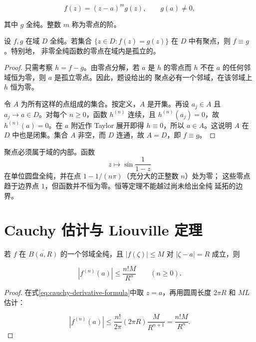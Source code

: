 \begin{equation}
 f(z)=(z-a)^m g(z),\qquad g(a)\ne0,
 \label{eq:holomorphic-zero-factorization}
\end{equation}

其中 \(g\) 全纯。整数 \(m\) 称为零点的阶。

\begin{corollary}[恒等定理]
\label{cor:holomorphic-identity-theorem}
设 \(f,g\) 在域 \(D\) 全纯。若集合
\(\{z\in D:f(z)=g(z)\}\) 在 \(D\) 中有聚点，则 \(f\equiv g\)。特别地，
非零全纯函数的零点在域内是孤立的。
\end{corollary}

\begin{proof}
只需考察 \(h=f-g\)。由零点分解，若 \(a\) 是 \(h\) 的零点而 \(h\)
不在 \(a\) 的任何邻域恒为零，则 \(a\) 是孤立零点。因此，题设给出的
聚点必有一个邻域，在该邻域上 \(h\) 恒为零。

令 \(A\) 为所有这样的点组成的集合。按定义，\(A\) 是开集。再设
\(a_j\in A\) 且 \(a_j\to a\in D\)。对每个 \(n\geq 0\)，函数
\(h^{(n)}\) 连续，且 \(h^{(n)}(a_j)=0\)，故 \(h^{(n)}(a)=0\)。在
\(a\) 附近作 Taylor 展开即得 \(h\equiv0\)，所以 \(a\in A\)。这说明
\(A\) 在 \(D\) 中也是闭集。集合 \(A\) 非空，而 \(D\) 连通，故
\(A=D\)，即 \(f\equiv g\)。
\end{proof}

聚点必须属于域的内部。函数
\[
 z\longmapsto \sin\frac1{1-z}
\]
在单位圆盘全纯，并在点 \(1-1/(n\pi)\)（充分大的正整数 \(n\)）处为零；
这些零点趋于边界点 \(1\)，但函数并不恒为零。恒等定理不能越过尚未给出全纯
延拓的边界。

\section{Cauchy 估计与 Liouville 定理}

\begin{theorem}[Cauchy 估计]
\label{thm:cauchy-estimates}
若 \(f\) 在 \(\overline{B(a,R)}\) 的一个邻域全纯，且
\(|f(\zeta)|\le M\) 对 \(|\zeta-a|=R\) 成立，则

\[
 |f^{(n)}(a)|\le\frac{n!M}{R^n}
 \qquad(n\ge0).
\]
\end{theorem}

\begin{proof}
在式\eqref{eq:cauchy-derivative-formula}中取 \(z=a\)，再用圆周长度
\(2\pi R\) 和 \(ML\) 估计：

\[
 |f^{(n)}(a)|
 \le\frac{n!}{2\pi}(2\pi R)\frac{M}{R^{n+1}}
 =\frac{n!M}{R^n}.
\]
\end{proof}

